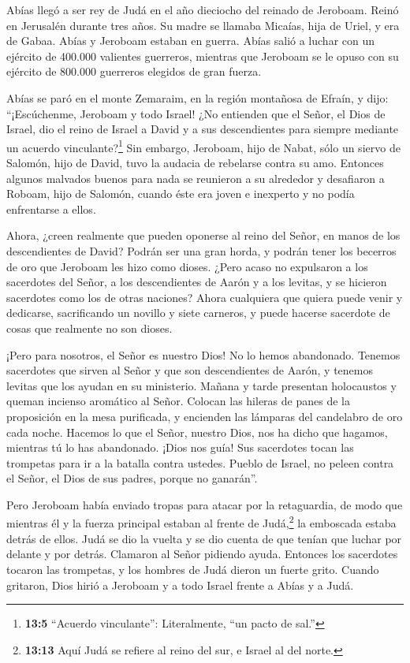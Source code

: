  Abías llegó a ser rey de Judá en el año dieciocho del
reinado de Jeroboam.  Reinó en Jerusalén durante tres años.
Su madre se llamaba Micaías, hija de Uriel, y era de Gabaa. Abías y
Jeroboam estaban en guerra.  Abías salió a luchar con un
ejército de 400.000 valientes guerreros, mientras que Jeroboam se le
opuso con su ejército de 800.000 guerreros elegidos de gran fuerza.

 Abías se paró en el monte Zemaraim, en la región montañosa
de Efraín, y dijo: ``¡Escúchenme, Jeroboam y todo Israel! 
¿No entienden que el Señor, el Dios de Israel, dio el reino de Israel a
David y a sus descendientes para siempre mediante un acuerdo
vinculante?\footnote{\textbf{13:5} ``Acuerdo vinculante'': Literalmente,
  ``un pacto de sal.''}  Sin embargo, Jeroboam, hijo de
Nabat, sólo un siervo de Salomón, hijo de David, tuvo la audacia de
rebelarse contra su amo.  Entonces algunos malvados buenos
para nada se reunieron a su alrededor y desafiaron a Roboam, hijo de
Salomón, cuando éste era joven e inexperto y no podía enfrentarse a
ellos.

 Ahora, ¿creen realmente que pueden oponerse al reino del
Señor, en manos de los descendientes de David? Podrán ser una gran
horda, y podrán tener los becerros de oro que Jeroboam les hizo como
dioses.  ¿Pero acaso no expulsaron a los sacerdotes del
Señor, a los descendientes de Aarón y a los levitas, y se hicieron
sacerdotes como los de otras naciones? Ahora cualquiera que quiera puede
venir y dedicarse, sacrificando un novillo y siete carneros, y puede
hacerse sacerdote de cosas que realmente no son dioses.

 ¡Pero para nosotros, el Señor es nuestro Dios! No lo hemos
abandonado. Tenemos sacerdotes que sirven al Señor y que son
descendientes de Aarón, y tenemos levitas que los ayudan en su
ministerio.  Mañana y tarde presentan holocaustos y queman
incienso aromático al Señor. Colocan las hileras de panes de la
proposición en la mesa purificada, y encienden las lámparas del
candelabro de oro cada noche. Hacemos lo que el Señor, nuestro Dios, nos
ha dicho que hagamos, mientras tú lo has abandonado.  ¡Dios
nos guía! Sus sacerdotes tocan las trompetas para ir a la batalla contra
ustedes. Pueblo de Israel, no peleen contra el Señor, el Dios de sus
padres, porque no ganarán''.

 Pero Jeroboam había enviado tropas para atacar por la
retaguardia, de modo que mientras él y la fuerza principal estaban al
frente de Judá,\footnote{\textbf{13:13} Aquí Judá se refiere al reino
  del sur, e Israel al del norte.} la emboscada estaba detrás de ellos.
 Judá se dio la vuelta y se dio cuenta de que tenían que
luchar por delante y por detrás. Clamaron al Señor pidiendo ayuda.
Entonces los sacerdotes tocaron las trompetas,  y los
hombres de Judá dieron un fuerte grito. Cuando gritaron, Dios hirió a
Jeroboam y a todo Israel frente a Abías y a Judá.

